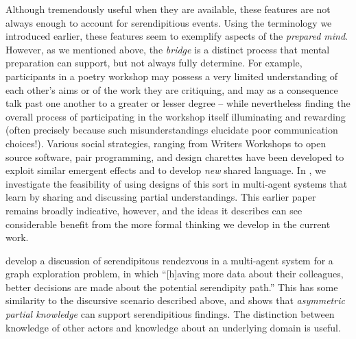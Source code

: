 Although tremendously useful when they are available, these features
are not always enough to account for serendipitious events.  Using the
terminology we introduced earlier, these features seem to exemplify
aspects of the \emph{prepared mind}.  However, as we mentioned above,
the \emph{bridge} is a distinct process that mental preparation can
support, but not always fully determine.  For example, participants in
a poetry workshop may possess a very limited understanding of each
other's aims or of the work they are critiquing, and may as a
consequence talk past one another to a greater or lesser degree --
while nevertheless finding the overall process of participating in the
workshop itself illuminating and rewarding (often precisely because
such misunderstandings elucidate poor communication choices!).
Various social strategies, ranging from Writers Workshops to open
source software, pair programming, and design charettes
\cite[p. 11]{gabriel2002writer} have been developed to exploit similar
emergent effects and to develop \emph{new} shared language.  In
\cite{poetry-workshop}, we investigate the feasibility of using
designs of this sort in multi-agent systems that learn by sharing and
discussing partial understandings.  This earlier paper remains broadly
indicative, however, and the ideas it describes can see considerable
benefit from the more formal thinking we develop in the current work.

 develop a discussion of serendipitous
rendezvous in a multi-agent system for a graph exploration problem, in
which ``[h]aving more data about their colleagues, better decisions
are made about the potential serendipity path.''  This has some
similarity to the discursive scenario described above, and shows that
\emph{asymmetric partial knowledge} can support serendipitious
findings.  The distinction between knowledge of other actors and
knowledge about an underlying domain is useful.

